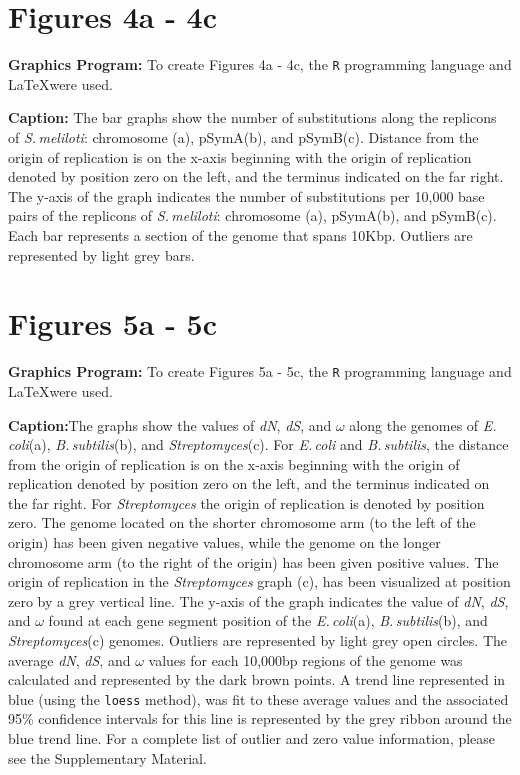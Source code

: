 \documentclass[11pt]{article}
\newcommand{\strep}{\textit{Streptomyces}\xspace}
\newcommand{\ecol}{\textit{E.\,coli}\xspace}
\newcommand{\bass}{\textit{B.\,subtilis}\xspace}
\newcommand{\smel}{\textit{S.\,meliloti}\xspace}
\newcommand{\pa}{pSymA\xspace}
\newcommand{\pb}{pSymB\xspace}
\newcommand{\dn}{\textit{dN}\xspace}
\newcommand{\ds}{\textit{dS}\xspace}
\begin{document}
\section*{Figures 4a - 4c}
\textbf{Graphics Program:}
To create Figures 4a - 4c, the \texttt{R} programming language and \LaTeX were used.

\textbf{Caption:} The bar graphs show the number of substitutions along the replicons of \smel: chromosome (a), \pa (b), and \pb (c). Distance from the origin of replication is on the x-axis beginning with the origin of replication denoted by position zero on the left, and the terminus indicated on the far right. The y-axis of the graph indicates the number of substitutions per 10,000 base pairs of the replicons of \smel: chromosome (a), \pa (b), and \pb (c). Each bar represents a section of the genome that spans 10Kbp. Outliers are represented by light grey bars.

\section*{Figures 5a - 5c}
\textbf{Graphics Program:}
To create Figures 5a - 5c, the \texttt{R} programming language and \LaTeX were used.

\textbf{Caption:}The graphs show the values of  \dn, \ds, and $\omega$ along the genomes of \ecol (a), \bass (b), and \strep (c). For \ecol and \bass, the distance from the origin of replication is on the x-axis beginning with the origin of replication denoted by position zero on the left, and the terminus indicated on the far right. For \strep the origin of replication is denoted by position zero. The genome located on the shorter chromosome arm (to the left of the origin) has been given negative values, while the genome on the longer chromosome arm (to the right of the origin) has been given positive values. The origin of replication in the \strep graph (c), has been visualized at position zero by a grey vertical line. The y-axis of the graph indicates the value of \dn, \ds, and $\omega$ found at each gene segment position of the \ecol (a), \bass (b), and \strep (c) genomes. Outliers are represented by light grey open circles. The average \dn, \ds, and $\omega$ values for each 10,000bp regions of the genome was calculated and represented by the dark brown points. A trend line represented in blue (using the \texttt{loess} method), was fit to these average values and the associated 95\% confidence intervals for this line is represented by the grey ribbon around the blue trend line. For a complete list of outlier and zero value information, please see the Supplementary Material.
\end{document}

